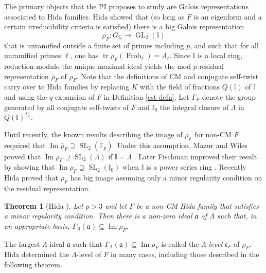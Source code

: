 \documentclass[11pt]{amsart}
\newtheorem{thm}{Theorem}[section]
\theoremstyle{definition}
\theoremstyle{remark}
\DeclareMathOperator{\Frob}{Frob}
\DeclareMathOperator{\tr}{tr}
\def\Aa{\mathfrak{a}}
\def\cc{\mathfrak{c}}
\def\F{\mathbb{F}}
\def\I{\mathbb{I}}
\def\Q{\mathbb{Q}}
\DeclareMathOperator{\GL}{GL}
\DeclareMathOperator{\im}{Im}
\DeclareMathOperator{\SL}{SL}
\begin{document}
The primary objects that the PI proposes to study are Galois representations associated to Hida families.  Hida showed \cite{Hida86b} that (so long as $F$ is an eigenform and a certain irreducibility criteria is satisfied) there is a big Galois representation 
\[
\rho_F : G_\Q \to \GL_2(\I)
\] 
that is unramified outside a finite set of primes including $p$, and such that for all unramified primes $\ell$, one has $\tr \rho_F(\Frob_\ell) = A_\ell$.  Since $\I$ is a local ring, reduction modulo the unique maximal ideal yields the mod $p$ residual representation $\bar{\rho}_F$ of $\rho_F$.  Note that the definitions of CM and conjugate self-twist carry over to Hida families by replacing $K$ with the field of fractions $Q(\I)$ of $\I$ and using the $q$-expansion of $F$ in Definition \ref{cst defn}.  Let $\Gamma_F$ denote the group generated by all conjugate self-twists of $F$ and $\I_0$ the integral closure of $\Lambda$ in $Q(\I)^{\Gamma_F}$.  

Until recently, the known results describing the image of $\rho_F$ for non-CM $F$ required that $\im \bar{\rho}_F \supseteq \SL_2(\F_p)$.  Under this assumption, Mazur and Wiles proved that $\im \rho_F \supseteq \SL_2(\Lambda)$ if $\I = \Lambda$ \cite{MazurWiles86}.  Later Fischman improved their result by showing that $\im \rho_F \supseteq \SL_2(\I_0)$ when $\I$ is a power series ring \cite{Fischman02}.  Recently Hida proved that $\rho_F$ has big image assuming only a minor regularity condition on the residual representation.

\begin{thm}[Hida \cite{Hida15}]\label{HidaI}
Let $p > 3$ and let $F$ be a non-CM Hida family that satisfies a minor regularity condition.  Then there is a non-zero ideal $\Aa$ of $\Lambda$ such that, in an appropriate basis, $\Gamma_\Lambda(\Aa) \subseteq \im \rho_F$.  
\end{thm}

The largest $\Lambda$-ideal $\Aa$ such that $\Gamma_\Lambda(\Aa) \subseteq \im \rho_F$ is called the \textit{$\Lambda$-level} $\cc_F$ of $\rho_F$.  Hida determined the $\Lambda$-level of $F$ in many cases, including those described in the following theorem.
\end{document}
